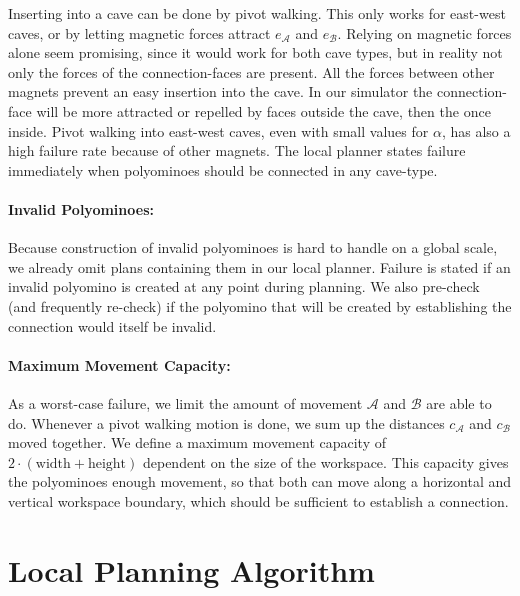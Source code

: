 Inserting into a cave can be done by pivot walking.
This only works for east-west caves, or by letting magnetic forces attract $e_\mathcal{A}$ and $e_\mathcal{B}$.
Relying on magnetic forces alone seem promising, since it would work for both cave types, but in reality not only the forces of the connection-faces are present.
All the forces between other magnets prevent an easy insertion into the cave.
In our simulator the connection-face will be more attracted or repelled by faces outside the cave, then the once inside.
Pivot walking into east-west caves, even with small values for $\alpha$, has also a high failure rate because of other magnets.
The local planner states failure immediately when polyominoes should be connected in any cave-type.

\paragraph{Invalid Polyominoes:}

Because construction of invalid polyominoes is hard to handle on a global scale, we already omit plans containing them in our local planner.
Failure is stated if an invalid polyomino is created at any point during planning.
We also pre-check (and frequently re-check) if the polyomino that will be created by establishing the connection would itself be invalid. 

\paragraph{Maximum Movement Capacity:}

As a worst-case failure, we limit the amount of movement $\mathcal{A}$ and $\mathcal{B}$ are able to do.
Whenever a pivot walking motion is done, we sum up the distances $c_\mathcal{A}$ and $c_\mathcal{B}$ moved together.
We define a maximum movement capacity of $2\cdot(\text{width} + \text{height})$ dependent on the size of the workspace.
This capacity gives the polyominoes enough movement, so that both can move along a horizontal and vertical workspace boundary, which should be sufficient to establish a connection.

\section{Local Planning Algorithm}
\label{sec:local_algo}

